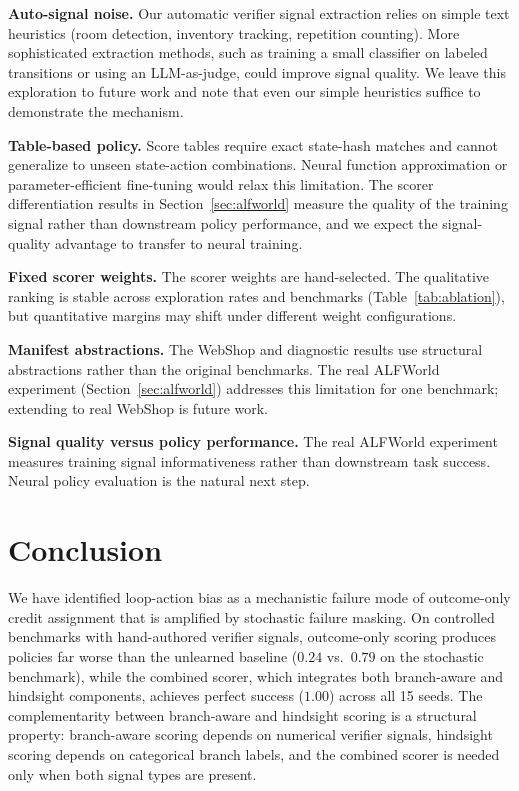 \documentclass[11pt]{article}
\begin{document}
\textbf{Auto-signal noise.} Our automatic verifier signal extraction relies on simple text heuristics (room detection, inventory tracking, repetition counting). More sophisticated extraction methods, such as training a small classifier on labeled transitions or using an LLM-as-judge, could improve signal quality. We leave this exploration to future work and note that even our simple heuristics suffice to demonstrate the mechanism.

\textbf{Table-based policy.} Score tables require exact state-hash matches and cannot generalize to unseen state-action combinations. Neural function approximation \citep{choudhury2025process} or parameter-efficient fine-tuning would relax this limitation. The scorer differentiation results in Section~\ref{sec:alfworld} measure the quality of the training signal rather than downstream policy performance, and we expect the signal-quality advantage to transfer to neural training.

\textbf{Fixed scorer weights.} The scorer weights are hand-selected. The qualitative ranking is stable across exploration rates and benchmarks (Table~\ref{tab:ablation}), but quantitative margins may shift under different weight configurations.

\textbf{Manifest abstractions.} The WebShop and diagnostic results use structural abstractions rather than the original benchmarks. The real ALFWorld experiment (Section~\ref{sec:alfworld}) addresses this limitation for one benchmark; extending to real WebShop is future work.

\textbf{Signal quality versus policy performance.} The real ALFWorld experiment measures training signal informativeness rather than downstream task success. Neural policy evaluation is the natural next step.

\section{Conclusion}

We have identified loop-action bias as a mechanistic failure mode of outcome-only credit assignment that is amplified by stochastic failure masking. On controlled benchmarks with hand-authored verifier signals, outcome-only scoring produces policies far worse than the unlearned baseline ($0.24$ vs.\ $0.79$ on the stochastic benchmark), while the combined scorer, which integrates both branch-aware and hindsight components, achieves perfect success ($1.00$) across all 15 seeds. The complementarity between branch-aware and hindsight scoring is a structural property: branch-aware scoring depends on numerical verifier signals, hindsight scoring depends on categorical branch labels, and the combined scorer is needed only when both signal types are present.
\end{document}
